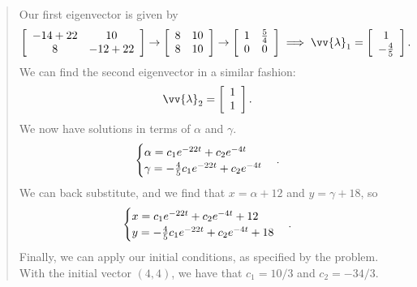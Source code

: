 \documentclass{hw}
\begin{document}
\begin{enumerate}
\begin{quote}
Our first eigenvector is given by
\[
\left[
\begin{array}{c c}
-14+22 & 10\\
8 & -12+22
\end{array}
\right]
\to
\left[
\begin{array}{c c}
8 & 10\\
8 & 10
\end{array}
\right]
\to
\left[
\begin{array}{c c}
1 & {5\over 4}\\
0 & 0
\end{array}
\right]
\implies
\vv{\lambda}_{1} =
\left[
\begin{array}{c}
1\\
-{4\over5}
\end{array}
\right].
\]
We can find the second eigenvector in a similar fashion:
\[
\vv{\lambda}_{2} =
\left[
\begin{array}{c}
1\\
1
\end{array}
\right].
\]
We now have solutions in terms of $\alpha$ and $\gamma$.
\[
\begin{cases}
\alpha = c_{1}e^{-22t}+c_{2}e^{-4t}\\
\gamma = -{4\over5}c_{1}e^{-22t} + c_{2}e^{-4t}
\end{cases}.
\]
We can back substitute, and we find that $x = \alpha + 12$ and $y = \gamma + 18$, so
\[
\begin{cases}
x = c_{1}e^{-22t}+c_{2}e^{-4t} + 12\\
y = -{4\over5}c_{1}e^{-22t} + c_{2}e^{-4t}+18
\end{cases}.
\]
Finally, we can apply our initial conditions, as specified by the problem. With the initial vector
$(4,4)$, we have that $c_{1} = 10/3$ and $c_{2} = -34/3$.
\end{quote}
\end{enumerate}

\newpage
\end{document}
